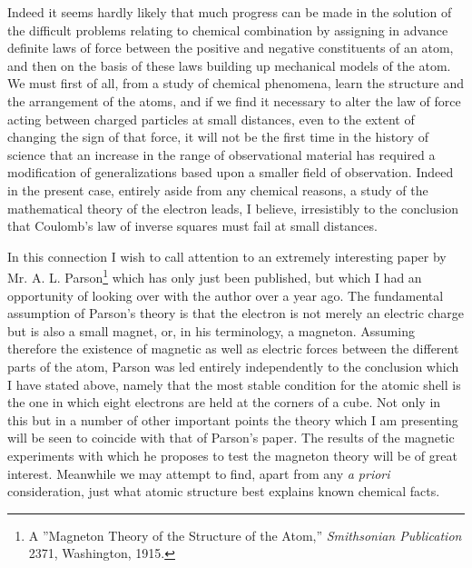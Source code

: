 \documentclass[11pt]{memoir}
\begin{document}
Indeed it seems hardly likely that much progress can be made in the solution of the difficult problems relating to chemical combination by assigning in advance definite laws of force between the positive and negative constituents of an atom, and then on the basis of these laws building up mechanical models of the atom.  We must first of all, from a study of chemical phenomena, learn the structure and the arrangement of the atoms, and if we find it necessary to alter the law of force acting between charged particles at small distances, even to the extent of changing the sign of that force, it will not be the first time in the history of science that an increase in the range of observational material has required a modification of generalizations based upon a smaller field of observation.  Indeed in the present case, entirely aside from any chemical reasons, a study of the mathematical theory of the electron leads, I believe, irresistibly to the conclusion that Coulomb's law of inverse squares must fail at small distances.

In this connection I wish to call attention to an extremely interesting paper by Mr. A. L. Parson\footnote{A ''Magneton Theory of the Structure of the Atom,'' \emph{Smithsonian Publication} 2371, Washington, 1915.} which has only just been published, but which I had an opportunity of looking over with the author over a year ago.  The fundamental assumption of Parson's theory is that the electron is not merely an electric charge but is also a small magnet, or, in his terminology, a magneton.  Assuming therefore the existence of magnetic as well as electric forces between the different parts of the atom, Parson was led entirely independently to the conclusion which I have stated above, namely that the most stable condition for the atomic shell is the one in which eight electrons are held at the corners of a cube.  Not only in this but in a number of other important points the theory which I am presenting will be seen to coincide with that of Parson's paper.  The results of the magnetic experiments with which he proposes to test the magneton theory will be of great interest.  Meanwhile we may attempt to find, apart from any \emph{a priori} consideration, just what atomic structure best explains known chemical facts.
\end{document}
